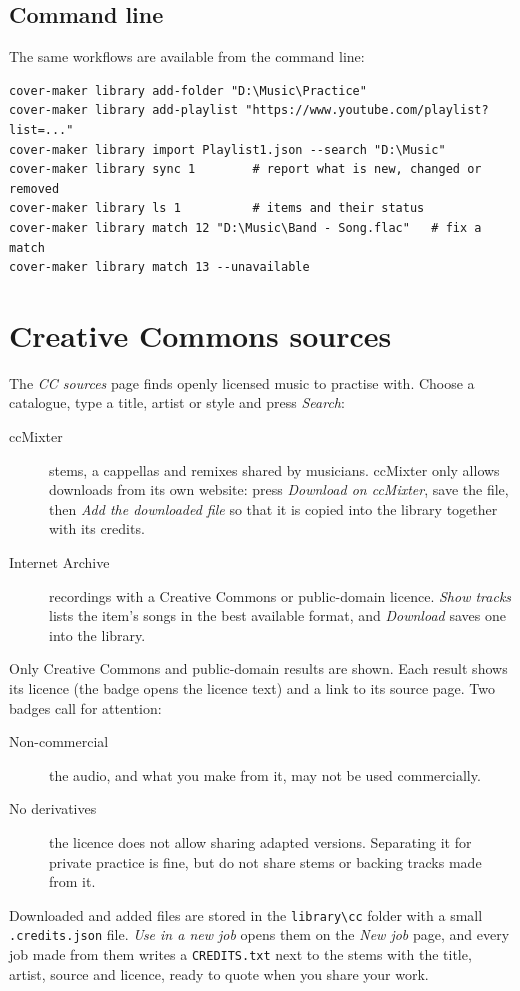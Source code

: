 \documentclass{covermaker}
\begin{document}
\section{Command line}
The same workflows are available from the command line:
\begin{lstlisting}
cover-maker library add-folder "D:\Music\Practice"
cover-maker library add-playlist "https://www.youtube.com/playlist?list=..."
cover-maker library import Playlist1.json --search "D:\Music"
cover-maker library sync 1        # report what is new, changed or removed
cover-maker library ls 1          # items and their status
cover-maker library match 12 "D:\Music\Band - Song.flac"   # fix a match
cover-maker library match 13 --unavailable
\end{lstlisting}

\chapter{Creative Commons sources}
The \emph{CC sources} page finds openly licensed music to practise with. Choose
a catalogue, type a title, artist or style and press \emph{Search}:
\begin{description}
  \item[ccMixter] stems, a cappellas and remixes shared by musicians. ccMixter
  only allows downloads from its own website: press \emph{Download on
  ccMixter}, save the file, then \emph{Add the downloaded file} so that it is
  copied into the library together with its credits.
  \item[Internet Archive] recordings with a Creative Commons or public-domain
  licence. \emph{Show tracks} lists the item's songs in the best available
  format, and \emph{Download} saves one into the library.
\end{description}
Only Creative Commons and public-domain results are shown. Each result shows
its licence (the badge opens the licence text) and a link to its source page.
Two badges call for attention:
\begin{description}
  \item[Non-commercial] the audio, and what you make from it, may not be used
  commercially.
  \item[No derivatives] the licence does not allow sharing adapted versions.
  Separating it for private practice is fine, but do not share stems or
  backing tracks made from it.
\end{description}
Downloaded and added files are stored in the \texttt{library\textbackslash cc}
folder with a small \texttt{.credits.json} file. \emph{Use in a new job} opens
them on the \emph{New job} page, and every job made from them writes a
\texttt{CREDITS.txt} next to the stems with the title, artist, source and
licence, ready to quote when you share your work.
\end{document}
